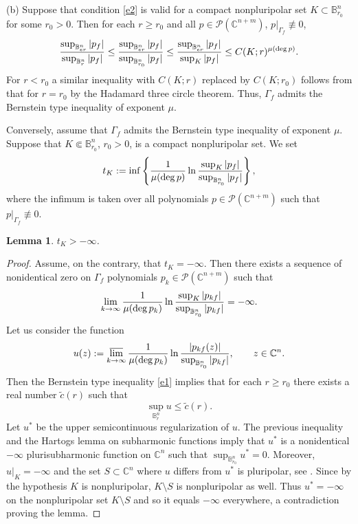 \documentclass[11pt, oneside]{amsart}
\newtheorem{Lm}[Th]{Lemma}
\begin{document}
(b) Suppose that condition \eqref{e2}  is valid for a compact nonpluripolar set $K\subset\mathbb B_{r_0}^n$ for some $r_0>0$. Then for each $r\ge r_0$  and all $p\in\mathcal P(\mathbb C^{n+m})$, $p|_{\Gamma_f}\not\equiv 0$, 
\[
\frac{\sup_{\mathbb B^n_{er}} |p_f|}{\sup_{\mathbb B^n_r} |p_f|}\le \frac{\sup_{\mathbb B^n_{er}} |p_f|}{\sup_{\mathbb B^n_{r_0}} |p_f|}\le \frac{\sup_{\mathbb B^n_{er}} |p_f|}{\sup_{K} |p_f|}\le C(K;r)^{\mu({\rm deg}\,p)}.
\]
For $r< r_0$ a similar inequality with $C(K;r)$ replaced by $C(K;r_0)$ follows from that for $r=r_0$ by the Hadamard three circle theorem. Thus, $\Gamma_f$ admits the Bernstein type inequality of exponent $\mu$.

Conversely, assume that $\Gamma_f$ admits the Bernstein type inequality of exponent $\mu$. Suppose that $K\Subset\mathbb B^n_{r_0}$, $r_0>0$, is a compact nonpluripolar set. We set
\[
t_K:=\inf\left\{\frac{1}{\mu({\rm deg}\,p)}\ln \frac{\sup_K |p_f|}{\sup_{\mathbb B^n_{r_0}}|p_f|}   \right\},
\]
where the infimum is taken over all polynomials $p\in \mathcal P(\mathbb C^{n+m})$ such that $p|_{\Gamma_f}\not\equiv 0$.
\begin{Lm}\label{lem2.2}
$t_K>-\infty$.
\end{Lm}
\begin{proof}
Assume, on the contrary, that $t_K=-\infty$. Then there
exists a sequence of nonidentical zero on $\Gamma_f$ polynomials $p_k\in \mathcal P(\mathbb C^{n+m})$ such that
\[
\lim_{k\rightarrow\infty}\frac{1}{\mu({\rm deg}\,p_{k })}\ln \frac{\sup_K |p_{k f}|}{\sup_{\mathbb B^n_{r_0}}|p_{kf}|}=-\infty. 
\]
Let us consider the function
\[
u(z):=\varlimsup_{k\rightarrow\infty}\frac{1}{\mu({\rm deg}\,p_{k})}\ln \frac{|p_{kf}(z)|}{\sup_{\mathbb B^n_{r_0}}|p_{kf}|},\qquad z\in\mathbb C^n.
\]
Then the Bernstein type inequality \eqref{e1} implies that for each $r\ge r_0$ there exists a real number $\tilde c(r)$ such that
\[
\sup_{\mathbb B_r^n}u\le \tilde c(r).
\]
Let $u^*$ be the upper semicontinuous regularization of $u$. The previous inequality and the Hartogs lemma on subharmonic functions imply that $u^*$ is a nonidentical $-\infty$ plurisubharmonic function on $\mathbb C^n$ such that
$\sup_{\mathbb B_{r_0}^n} u^*=0$. Moreover,  $u|_{K}=-\infty$ and the set $S\subset\mathbb C^n$ where $u$ differs from $u^*$ is pluripolar, see \cite[Th.\,4.2.5]{BT}. Since by the hypothesis $K$ is nonpluripolar, $K\setminus S$ is nonpluripolar as well. Thus $u^*=-\infty$ on the nonpluripolar set $K\setminus S$ and so it equals $-\infty$ everywhere, a contradiction proving the lemma.
\end{proof}
\end{document}
